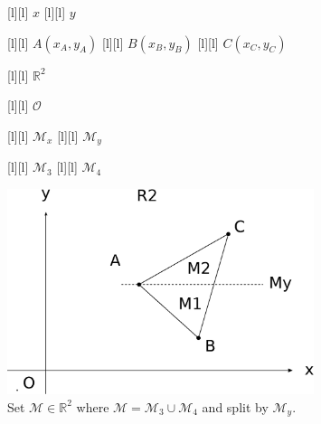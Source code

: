 \begin{figure}[ht]
	\centering
	\footnotesize

	[l] {$x$}
	[l] {$y$}

	[l] {$A(x_A,y_A)$}
	[l] {$B(x_B,y_B)$}
	[l] {$C(x_C,y_C)$}

	[l] {$\mathbb{R}^2$}

	[l] {$\mathcal{O}$}

	[l] {$\mathcal{M}_x$}
	[l] {$\mathcal{M}_y$}

	[l] {$\mathcal{M}_3$}
	[l] {$\mathcal{M}_4$}

	\includegraphics[width=0.8\textwidth]{setAinR2_Ay.eps}
	\caption{Set $\mathcal{M} \in \mathbb{R}^2$ where
		$\mathcal{M} = \mathcal{M}_{3} \cup \mathcal{M}_{4}$
		and split by $\mathcal{M}_y$.}
	\label{\LABEL}
\end{figure}
